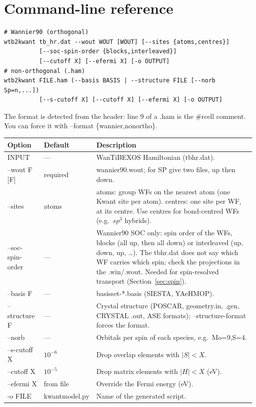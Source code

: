 \documentclass[11pt,a4paper]{article}
\newcommand{\code}[1]{{\ttfamily\def\_{\textunderscore\allowbreak}\def\slash{/\allowbreak}#1}}
\newcommand{\wtb}{WanTiBEXOS}
\begin{document}
\section{Command-line reference}

\begin{lstlisting}
# Wannier90 (orthogonal)
wtb2kwant tb_hr.dat --wout WOUT [WOUT] [--sites {atoms,centres}]
          [--soc-spin-order {blocks,interleaved}]
          [--cutoff X] [--efermi X] [-o OUTPUT]
# non-orthogonal (.ham)
wtb2kwant FILE.ham (--basis BASIS | --structure FILE [--norb Sp=n,...])
          [--s-cutoff X] [--cutoff X] [--efermi X] [-o OUTPUT]
\end{lstlisting}
The format is detected from the header: line 9 of a \code{.ham} is the \code{\#rcell}
comment. You can force it with \code{--format \{wannier,nonortho\}}.
\begin{center}
\begin{tabular}{p{3.6cm}p{2.2cm}p{8.2cm}}
\toprule
Option & Default & Description \\
\midrule
\code{INPUT} & --- & \wtb{} Hamiltonian (\code{tb\_hr.dat}). \\
\code{--wout F [F]} & required & \code{wannier90.wout}; for SP give two files, up then down. \\
\code{--sites} & \code{atoms} & \code{atoms}: group WFs on the nearest atom (one Kwant site
  per atom). \code{centres}: one site per WF, at its centre. Use \code{centres} for
  bond-centred WFs (e.g.\ $sp^3$ hybrids). \\
\code{--soc-spin-order} & --- & Wannier90 SOC only: spin order of the WFs, \code{blocks}
  (all up, then all down) or \code{interleaved} (up, down, up, \dots). The \code{tb\_hr.dat}
  does not say which WF carries which spin; check the projections in the \code{.win}/\code{.wout}.
  Needed for spin-resolved transport (Section~\ref{sec:spin}). \\
\code{--basis F} & --- & \code{basis\_set-*.basis} (SIESTA, YAeHMOP). \\
\code{--structure F} & --- & Crystal structure (POSCAR, \code{geometry.in}, \code{.gen},
  CRYSTAL \code{.out}, ASE formats); \code{--structure-format} forces the format. \\
\code{--norb} & --- & Orbitals per spin of each species, e.g.\ \code{Mo=9,S=4}. \\
\code{--s-cutoff X} & $10^{-6}$ & Drop overlap elements with $|S|<X$. \\
\code{--cutoff X} & $10^{-5}$ & Drop matrix elements with $|H|<X$ (eV). \\
\code{--efermi X} & from file & Override the Fermi energy (eV). \\
\code{-o FILE} & \code{kwant\_model.py} & Name of the generated script. \\
\bottomrule
\end{tabular}
\end{center}
\end{document}
